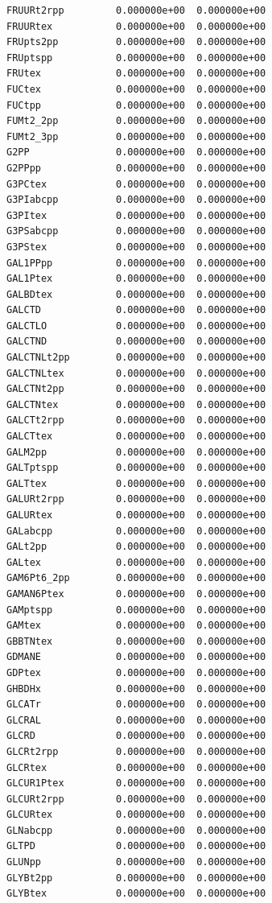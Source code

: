 \documentclass{scrartcl}
\begin{document}
\begin{enumerate}
\begin{lstlisting}
FRUURt2rpp         0.000000e+00  0.000000e+00
FRUURtex           0.000000e+00  0.000000e+00
FRUpts2pp          0.000000e+00  0.000000e+00
FRUptspp           0.000000e+00  0.000000e+00
FRUtex             0.000000e+00  0.000000e+00
FUCtex             0.000000e+00  0.000000e+00
FUCtpp             0.000000e+00  0.000000e+00
FUMt2_2pp          0.000000e+00  0.000000e+00
FUMt2_3pp          0.000000e+00  0.000000e+00
G2PP               0.000000e+00  0.000000e+00
G2PPpp             0.000000e+00  0.000000e+00
G3PCtex            0.000000e+00  0.000000e+00
G3PIabcpp          0.000000e+00  0.000000e+00
G3PItex            0.000000e+00  0.000000e+00
G3PSabcpp          0.000000e+00  0.000000e+00
G3PStex            0.000000e+00  0.000000e+00
GAL1PPpp           0.000000e+00  0.000000e+00
GAL1Ptex           0.000000e+00  0.000000e+00
GALBDtex           0.000000e+00  0.000000e+00
GALCTD             0.000000e+00  0.000000e+00
GALCTLO            0.000000e+00  0.000000e+00
GALCTND            0.000000e+00  0.000000e+00
GALCTNLt2pp        0.000000e+00  0.000000e+00
GALCTNLtex         0.000000e+00  0.000000e+00
GALCTNt2pp         0.000000e+00  0.000000e+00
GALCTNtex          0.000000e+00  0.000000e+00
GALCTt2rpp         0.000000e+00  0.000000e+00
GALCTtex           0.000000e+00  0.000000e+00
GALM2pp            0.000000e+00  0.000000e+00
GALTptspp          0.000000e+00  0.000000e+00
GALTtex            0.000000e+00  0.000000e+00
GALURt2rpp         0.000000e+00  0.000000e+00
GALURtex           0.000000e+00  0.000000e+00
GALabcpp           0.000000e+00  0.000000e+00
GALt2pp            0.000000e+00  0.000000e+00
GALtex             0.000000e+00  0.000000e+00
GAM6Pt6_2pp        0.000000e+00  0.000000e+00
GAMAN6Ptex         0.000000e+00  0.000000e+00
GAMptspp           0.000000e+00  0.000000e+00
GAMtex             0.000000e+00  0.000000e+00
GBBTNtex           0.000000e+00  0.000000e+00
GDMANE             0.000000e+00  0.000000e+00
GDPtex             0.000000e+00  0.000000e+00
GHBDHx             0.000000e+00  0.000000e+00
GLCATr             0.000000e+00  0.000000e+00
GLCRAL             0.000000e+00  0.000000e+00
GLCRD              0.000000e+00  0.000000e+00
GLCRt2rpp          0.000000e+00  0.000000e+00
GLCRtex            0.000000e+00  0.000000e+00
GLCUR1Ptex         0.000000e+00  0.000000e+00
GLCURt2rpp         0.000000e+00  0.000000e+00
GLCURtex           0.000000e+00  0.000000e+00
GLNabcpp           0.000000e+00  0.000000e+00
GLTPD              0.000000e+00  0.000000e+00
GLUNpp             0.000000e+00  0.000000e+00
GLYBt2pp           0.000000e+00  0.000000e+00
GLYBtex            0.000000e+00  0.000000e+00

\end{lstlisting}
\end{enumerate}
\end{document}
